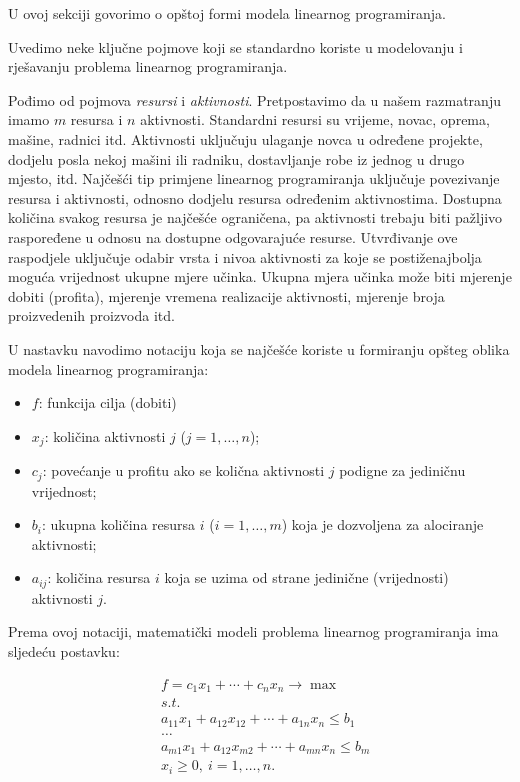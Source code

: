 \documentclass[a4paper, utf8, 11pt, colorlinks]{book}
\begin{document}
U ovoj sekciji govorimo o opštoj formi modela linearnog programiranja. 

Uvedimo neke ključne pojmove koji se standardno koriste u modelovanju i rješavanju problema linearnog programiranja. 

Pođimo od pojmova \textit{resursi} i \textit{aktivnosti}. Pretpostavimo da u našem razmatranju imamo $m$ resursa i $n$ aktivnosti. Standardni resursi su vrijeme, novac, oprema, mašine, radnici itd. Aktivnosti uključuju ulaganje novca u određene projekte, dodjelu posla nekoj mašini ili radniku,  dostavljanje robe iz jednog u drugo mjesto, itd. 
 Najčešći tip primjene linearnog programiranja uključuje povezivanje resursa i aktivnosti, odnosno dodjelu resursa određenim aktivnostima. Dostupna količina svakog resursa je najčešće ograničena, pa aktivnosti trebaju biti pažljivo raspoređene u odnosu na dostupne odgovarajuće resurse.  Utvrđivanje ove raspodjele uključuje odabir vrsta i nivoa aktivnosti za koje se postiženajbolja moguća vrijednost ukupne mjere učinka. Ukupna mjera učinka može biti mjerenje dobiti (profita), mjerenje vremena realizacije aktivnosti, mjerenje broja proizvedenih proizvoda itd.

U nastavku navodimo notaciju koja se najčešće koriste u formiranju opšteg oblika modela linearnog programiranja:

\begin{itemize}
    \item $f$: funkcija cilja (dobiti) 
    \item $x_j$: količina aktivnosti $j$ ($j = 1,\ldots,n$);
    \item $c_j$: povećanje u profitu ako se količna aktivnosti $j$ podigne za jediničnu vrijednost;
    \item $b_i$: ukupna količina resursa $i$ ($i=1,\ldots,m$) koja je dozvoljena za alociranje aktivnosti;
    \item $a_{ij}$: količina resursa $i$ koja se uzima od strane jedinične (vrijednosti) aktivnosti $j$.
\end{itemize}
Prema ovoj notaciji, matematički modeli problema linearnog programiranja ima sljedeću postavku:

\begin{align} 
      &f = c_1 x_1 + \cdots + c_n x_n \rightarrow \max \label{form:LP-1}\\
      & s.t. \nonumber \\
      & a_{11}x_1 + a_{12} x_{12} + \cdots + a_{1n}x_n \leq b_1 \label{form:LP-2} \\
      &\ldots \nonumber \\
      & a_{m1}x_1 + a_{12} x_{m2} + \cdots + a_{mn}x_n \leq b_m \label{form:LP-3} \\
      & x_i \geq 0,\ i=1,\ldots,n.\label{form:LP-4}
\end{align}
\end{document}
